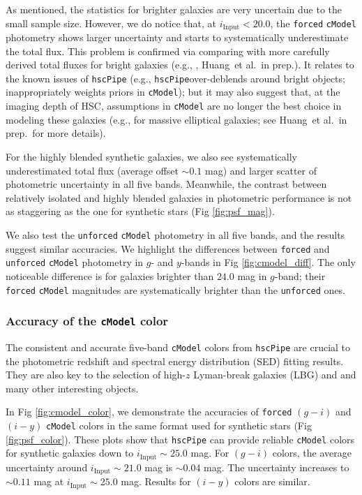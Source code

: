 \documentclass[useamsfonts]{pasj01}
\def\etal{{\ et al.~}}
\def\hscpipe{\texttt{hscPipe}}
\def\cmodel{\texttt{cModel}}
\def\forced{\texttt{forced}}
\def\unforced{\texttt{unforced}}
\begin{document}
    As mentioned, the statistics for brighter galaxies are very uncertain due to the
    small sample size.
    However, we do notice that, at $i_{\mathrm{Input}}<20.0$, the \forced{}
    \cmodel{} photometry shows larger uncertainty and starts to systematically
    underestimate the total flux.
    This problem is confirmed via comparing with more carefully derived total fluxes
    for bright galaxies (e.g., \citealt{HSCDR1}, Huang\etal in prep.).
    It relates to the known issues of \hscpipe{} (e.g., \hscpipe{}over-deblends around bright objects; inappropriately weights priors in \cmodel{}); but it may also suggest
    that, at the imaging depth of HSC, assumptions in \cmodel{} are no longer the
    best choice in modeling these galaxies (e.g., for massive elliptical galaxies;
    see Huang\etal in prep.~for more details).

    For the highly blended synthetic galaxies, we also see systematically
    underestimated total flux (average offset ${\sim}0.1$ mag) and larger scatter
    of photometric uncertainty in all five bands.
    Meanwhile, the contrast between relatively isolated and highly blended galaxies
    in photometric performance is not as staggering as the one for synthetic
    stars (Fig \ref{fig:psf_mag}).

    We also test the \unforced{} \cmodel{} photometry in all five bands, and the
    results suggest similar accuracies.
    We highlight the differences between \forced{} and \unforced{} \cmodel{}
    photometry in $g$- and $y$-bands in Fig \ref{fig:cmodel_diff}.
    The only noticeable difference is for galaxies brighter than $24.0$ mag in
    $g$-band; their \forced{} \cmodel{} magnitudes are systematically brighter than
    the \unforced{} ones.

\subsubsection{Accuracy of the \cmodel{} color}

    The consistent and accurate five-band \cmodel{} colors from \hscpipe{} are crucial
    to the photometric redshift and spectral energy distribution (SED) fitting results.
    They are also key to the selection of high-$z$ Lyman-break galaxies (LBG) and
    and many other interesting objects.

    In Fig \ref{fig:cmodel_color}, we demonstrate the accuracies of \forced{} $(g-i)$
    and $(i-y)$ \cmodel{} colors in the same format used for synthetic stars
    (Fig \ref{fig:psf_color}).
    These plots show that \hscpipe{} can provide reliable \cmodel{} colors for
    synthetic galaxies down to $i_{\mathrm{Input}}{\sim}25.0$ mag.
    For $(g-i)$ colors, the average uncertainty around $i_{\mathrm{Input}}{\sim}21.0$ mag
    is ${\sim}0.04$ mag.
    The uncertainty increases to ${\sim}0.11$ mag at $i_{\mathrm{Input}}{\sim}25.0$ mag.
    Results for $(i-y)$ colors are similar.
\end{document}
